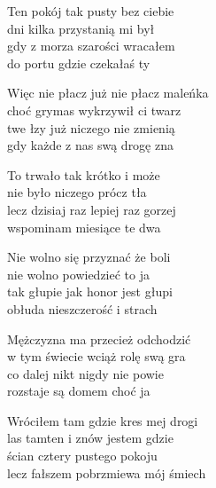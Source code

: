 \begin{text}
    Ten pokój tak pusty bez ciebie\\
    dni kilka przystanią mi był\\
    gdy z morza szarości wracałem\\
    do portu gdzie czekałaś ty

    Więc nie płacz już nie płacz maleńka\\
    choć grymas wykrzywił ci twarz\\
    twe łzy już niczego nie zmienią\\
    gdy każde z nas swą drogę zna

    To trwało tak krótko i może\\
    nie było niczego prócz tła\\
    lecz dzisiaj raz lepiej raz gorzej\\
    wspominam miesiące te dwa

    Nie wolno się przyznać że boli\\
    nie wolno powiedzieć to ja\\
    tak głupie jak honor jest głupi\\
    obłuda nieszczerość i strach

    Mężczyzna ma przecież odchodzić\\
    w tym świecie wciąż rolę swą gra\\
    co dalej nikt nigdy nie powie\\
    rozstaje są domem choć ja

    Wróciłem tam gdzie kres mej drogi\\
    las tamten i znów jestem gdzie\\
    ścian cztery pustego pokoju\\
    lecz fałszem pobrzmiewa mój śmiech
\end{text}
\begin{chord}

\end{chord}
